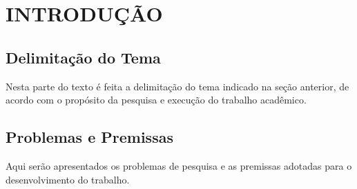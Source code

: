 \chapter{INTRODUÇÃO}
\section{Delimitação do Tema}
Nesta parte do texto é feita a delimitação do tema indicado na seção anterior, de acordo com o propósito da pesquisa e execução do trabalho acadêmico. 

\section{Problemas e Premissas}
Aqui serão apresentados os problemas de pesquisa e as premissas adotadas para o desenvolvimento do trabalho.
